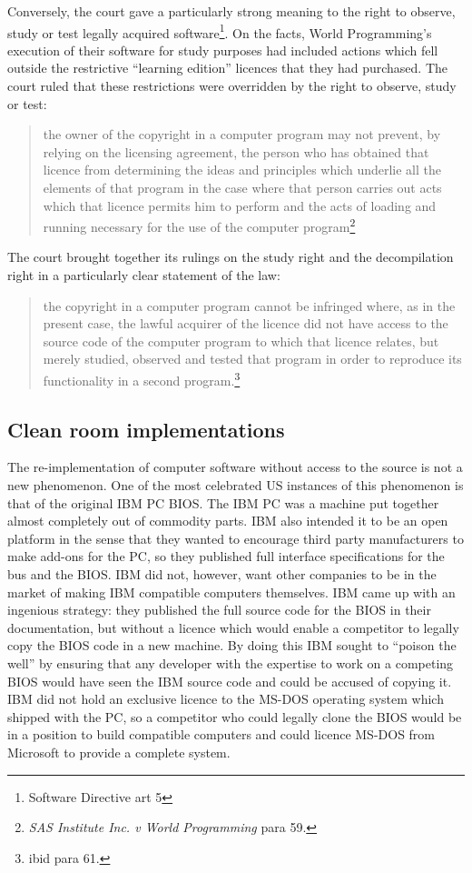 \documentclass[a4paper,12pt]{article}
\newcommand{\SD}[1][]{Software Directive #1\xspace}
\begin{document}
Conversely, the court gave a particularly strong meaning to the right to
observe, study or test legally acquired software\footnote{\SD[art 5]}. On
the facts, World Programming's execution of their software for study
purposes had included actions which fell outside the restrictive ``learning
edition'' licences that they had purchased. The court ruled that these
restrictions were overridden by the right to observe, study or test:
\begin{quotation}
  the owner of the copyright in a computer program may not prevent, by
  relying on the licensing agreement, the person who has obtained that
  licence from determining the ideas and principles which underlie all the
  elements of that program in the case where that person carries out acts
  which that licence permits him to perform and the acts of loading and
  running necessary for the use of the computer program\footnote{\textit{SAS
    Institute Inc. v World Programming} para 59.}
\end{quotation}
The court brought together its rulings on the study right and the
decompilation right in a particularly clear statement of the law:
\begin{quotation}
  the copyright in a computer program cannot be infringed where, as in the
  present case, the lawful acquirer of the licence did not have access to
  the source code of the computer program to which that licence relates, but
  merely studied, observed and tested that program in order to reproduce its
  functionality in a second program.\footnote{ibid para 61.}
\end{quotation}

\subsection{Clean room implementations}

The re-implementation of computer software without access to the source is
not a new phenomenon. One of the most celebrated US instances of this phenomenon is that of the
original IBM PC BIOS. The IBM PC was a machine put together almost
completely out of commodity parts. IBM also intended it to be an open
platform in the sense that they wanted to encourage third party
manufacturers to make add-ons for the PC, so they published full interface
specifications for the bus and the BIOS. IBM did not, however, want other
companies to be in the market of making IBM compatible computers
themselves. IBM came up with an ingenious strategy: they published the full
source code for the BIOS in their documentation, but without a licence which
would enable a competitor to legally copy the BIOS code in a new machine. By
doing this IBM sought to ``poison the well'' by ensuring that any developer
with the expertise to work on a competing BIOS would have seen the IBM
source code and could be accused of copying it. IBM did not hold an
exclusive licence to the  MS-DOS operating system which shipped with the PC,
so a competitor who could legally clone the BIOS would be in a position to
build compatible computers and could licence MS-DOS from Microsoft to
provide a complete system.
\end{document}
